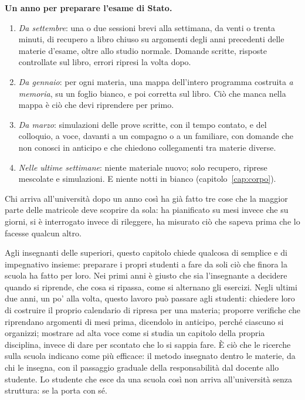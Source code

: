 \begin{inpratica}
\textbf{Un anno per preparare l'esame di Stato.}
\begin{enumerate}
  \item \emph{Da settembre}: una o due sessioni brevi alla settimana,
        da venti o trenta minuti, di recupero a libro chiuso su
        argomenti degli anni precedenti delle materie d'esame, oltre
        allo studio normale. Domande scritte, risposte controllate
        sul libro, errori ripresi la volta dopo.
  \item \emph{Da gennaio}: per ogni materia, una mappa dell'intero
        programma costruita \emph{a memoria}, su un foglio bianco, e
        poi corretta sul libro. Ciò che manca nella mappa è ciò che
        devi riprendere per primo.
  \item \emph{Da marzo}: simulazioni delle prove scritte, con il tempo
        contato, e del colloquio, a voce, davanti a un compagno o a un
        familiare, con domande che non conosci in anticipo e che
        chiedono collegamenti tra materie diverse.
  \item \emph{Nelle ultime settimane}: niente materiale nuovo; solo
        recupero, riprese mescolate e simulazioni. E niente notti in
        bianco (capitolo~\ref{cap:corpo}).
\end{enumerate}
\end{inpratica}

Chi arriva all'università dopo un anno così ha già fatto tre cose che
la maggior parte delle matricole deve scoprire da sola: ha pianificato
su mesi invece che su giorni, si è interrogato invece di rileggere, ha
misurato ciò che sapeva prima che lo facesse qualcun altro.

Agli insegnanti delle superiori, questo capitolo chiede qualcosa di
semplice e di impegnativo insieme: preparare i propri studenti a fare
da soli ciò che finora la scuola ha fatto per loro. Nei primi anni è
giusto che sia l'insegnante a decidere quando si riprende, che cosa si
ripassa, come si alternano gli esercizi. Negli ultimi due anni, un po'
alla volta, questo lavoro può passare agli studenti: chiedere loro di
costruire il proprio calendario di ripresa per una materia; proporre
verifiche che riprendano argomenti di mesi prima, dicendolo in
anticipo, perché ciascuno si organizzi; mostrare ad alta voce come si
studia un capitolo della propria disciplina, invece di dare per
scontato che lo si sappia fare. È ciò che le ricerche sulla scuola
indicano come più efficace: il metodo insegnato dentro le materie, da
chi le insegna, con il passaggio graduale della responsabilità dal
docente allo studente. Lo studente che esce da una scuola così non
arriva all'università senza struttura: se la porta con sé.

